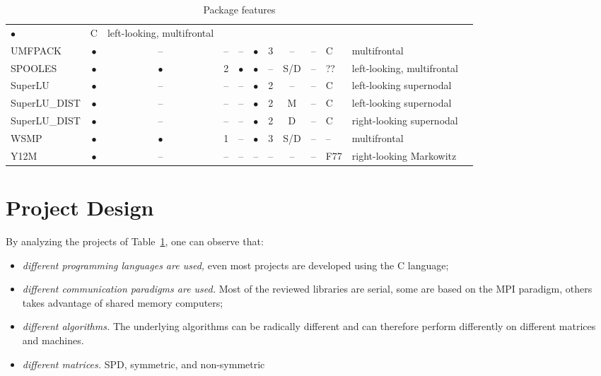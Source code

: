 \documentclass[acmtocl]{acmtrans2m}
\begin{document}
\begin{table}
\begin{center}
\begin{tabular}{| l | c c c c | c c c c l l | p{5cm} |}
$\bullet$ & C & left-looking, multifrontal &
\cite{irony04parallel,rotkin04design,rozin04locality} \\
%
UMFPACK     & $\bullet$ & --        & -- & --        & $\bullet$ & 3 & -- & --
& C & multifrontal & \cite{umfpack-home-page} \\
%
SPOOLES     & $\bullet$ & $\bullet$ & 2 & $\bullet$ & $\bullet$ & -- & S/D &
-- & ?? & left-looking, multifrontal & \cite{spooles} \\
%  
SuperLU     & $\bullet$ & --        & -- & --        & $\bullet$ & 2 & -- & --
& C & left-looking supernodal &  \cite{superlu-manual} \\
%
SuperLU\_DIST & $\bullet$ & --        & -- & --        & $\bullet$ & 2 & M & -- & C & left-looking supernodal &  \cite{superlu-manual} \\
SuperLU\_DIST & $\bullet$ & --        & -- & --        & $\bullet$ & 2 & D & -- & C & right-looking supernodal & \cite{superlu-manual} \\
WSMP & $\bullet$ & $\bullet$ & 1 & -- & $\bullet$ & 3 & S/D & -- & -- &
multifrontal & \cite{wsmp} \\
Y12M & $\bullet$ & -- & -- & -- & -- & -- & -- & -- & F77 & right-looking Markowitz & \cite{y12m} \\


\hline
\end{tabular}
\caption{Package features}
\label{tab:packages}
\end{center}
\end{table}


\section{Project Design}
\label{sec:design}

By analyzing the projects of Table~\ref{tab:packages}, one can observe that:
\begin{itemize}
\item {\sl different programming languages are used,} even most projects are
developed using the C language;

\item {\sl different communication paradigms are used.} 
 Most of the reviewed libraries are serial, some are based on the MPI
 paradigm, others takes advantage of shared memory computers;

\item {\sl different algorithms.} The underlying algorithms can be radically
different and can therefore perform differently on different matrices and
machines.

\item {\sl different matrices.}  SPD, symmetric, and non-symmetric
\end{itemize}
\end{document}
